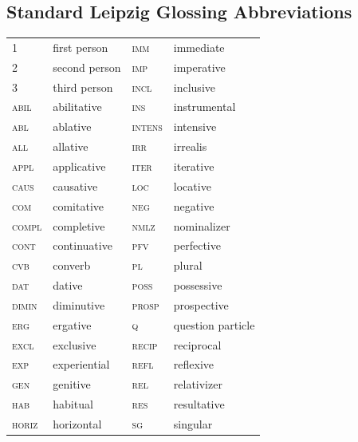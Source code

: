 \documentclass[11pt,a4paper]{article}
\begin{document}
\subsection*{Standard Leipzig Glossing Abbreviations}
\begin{tabular}{@{}ll@{\hspace{2em}}ll@{}}
\textsc{1} & first person & \textsc{imm} & immediate \\
\textsc{2} & second person & \textsc{imp} & imperative \\
\textsc{3} & third person & \textsc{incl} & inclusive \\
\textsc{abil} & abilitative & \textsc{ins} & instrumental \\
\textsc{abl} & ablative & \textsc{intens} & intensive \\
\textsc{all} & allative & \textsc{irr} & irrealis \\
\textsc{appl} & applicative & \textsc{iter} & iterative \\
\textsc{caus} & causative & \textsc{loc} & locative \\
\textsc{com} & comitative & \textsc{neg} & negative \\
\textsc{compl} & completive & \textsc{nmlz} & nominalizer \\
\textsc{cont} & continuative & \textsc{pfv} & perfective \\
\textsc{cvb} & converb & \textsc{pl} & plural \\
\textsc{dat} & dative & \textsc{poss} & possessive \\
\textsc{dimin} & diminutive & \textsc{prosp} & prospective \\
\textsc{erg} & ergative & \textsc{q} & question particle \\
\textsc{excl} & exclusive & \textsc{recip} & reciprocal \\
\textsc{exp} & experiential & \textsc{refl} & reflexive \\
\textsc{gen} & genitive & \textsc{rel} & relativizer \\
\textsc{hab} & habitual & \textsc{res} & resultative \\
\textsc{horiz} & horizontal & \textsc{sg} & singular \\
\end{tabular}

\vspace{1em}
\end{document}
